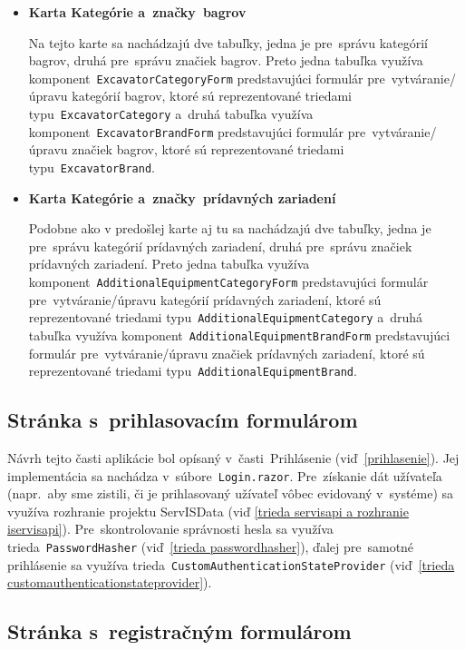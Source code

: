 \begin{itemize}
\item \textbf{Karta Kategórie a~značky~bagrov}

Na tejto karte sa nachádzajú dve tabuľky, jedna je pre~správu kategórií bagrov, druhá pre~správu značiek bagrov. Preto jedna tabuľka využíva komponent~\verb|ExcavatorCategoryForm| predstavujúci formulár pre~vytváranie/úpravu kategórií bagrov, ktoré sú reprezentované triedami typu~\verb|ExcavatorCategory| a~druhá tabuľka využíva komponent~\verb|ExcavatorBrandForm| predstavujúci formulár pre~vytváranie/úpravu značiek bagrov, ktoré sú reprezentované triedami typu~\verb|ExcavatorBrand|.

\item \textbf{Karta Kategórie a~značky~prídavných zariadení}

Podobne ako v predošlej karte aj tu sa nachádzajú dve tabuľky, jedna je pre~správu kategórií prídavných zariadení, druhá pre~správu značiek prídavných zariadení. Preto jedna tabuľka využíva komponent~\verb|AdditionalEquipmentCategoryForm| predstavujúci formulár pre~vytváranie/úpravu kategórií prídavných zariadení, ktoré sú reprezentované triedami typu~\verb|AdditionalEquipmentCategory| a~druhá tabuľka využíva komponent~\verb|AdditionalEquipmentBrandForm| predstavujúci formulár pre~vytváranie/úpravu značiek prídavných zariadení, ktoré sú reprezentované triedami typu~\verb|AdditionalEquipmentBrand|.
\end{itemize}

\subsection{Stránka s~prihlasovacím formulárom}

Návrh tejto časti aplikácie bol opísaný v~časti~Prihlásenie (viď~\ref{prihlasenie}). Jej implementácia sa nachádza v~súbore~\verb|Login.razor|. Pre~získanie dát užívateľa (napr.~aby sme zistili, či je prihlasovaný užívateľ vôbec evidovaný v~systéme) sa využíva rozhranie projektu ServISData (viď \ref{trieda servisapi a rozhranie iservisapi}). Pre~skontrolovanie správnosti hesla sa využíva trieda~\verb|PasswordHasher| (viď~\ref{trieda passwordhasher}), ďalej pre~samotné prihlásenie sa využíva trieda~\verb|CustomAuthenticationStateProvider| (viď~\ref{trieda customauthenticationstateprovider}).

\subsection{Stránka s~registračným formulárom}
\label{stranka s registracnym formularom}

